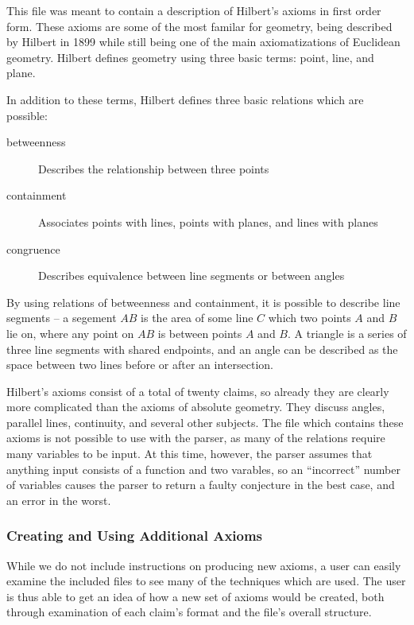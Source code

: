 This file was meant to contain a description of Hilbert's axioms \cite{geometry} in first order form. These axioms are some of the most familar for geometry, being described by Hilbert in 1899 while still being one of the main axiomatizations of Euclidean geometry. Hilbert defines geometry using three basic terms: point, line, and plane.


\noindent
In addition to these terms, Hilbert defines three basic relations which are possible:
\begin{description}
	\item[betweenness] Describes the relationship between three points
	\item[containment] Associates points with lines, points with planes, and lines with planes
	\item[congruence] Describes equivalence between line segments or between angles
	\end{description}

By using relations of betweenness and containment, it is possible to describe line segments -- a segement $AB$ is the area of some line $C$ which two points $A$ and $B$ lie on, where any point on $AB$ is between points $A$ and $B$. A triangle is a series of three line segments with shared endpoints, and an angle can be described as the space between two lines before or after an intersection.

Hilbert's axioms consist of a total of twenty claims, so already they are clearly more complicated than the axioms of absolute geometry. They discuss angles, parallel lines, continuity, and several other subjects. The file which contains these axioms is not possible to use with the parser, as many of the relations require many variables to be input. At this time, however, the parser assumes that anything input consists of a function and two varables, so an ``incorrect'' number of variables causes the parser to return a faulty conjecture in the best case, and an error in the worst.

\subsubsection{Creating and Using Additional Axioms}

While we do not include instructions on producing new axioms, a user can easily examine the included files to see many of the techniques which are used. The user is thus able to get an idea of how a new set of axioms would be created, both through examination of each claim's format and the file's overall structure.

